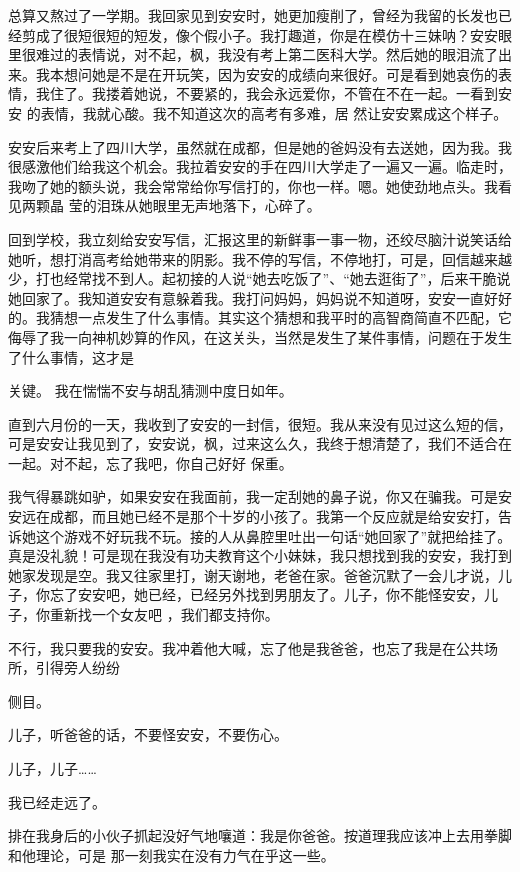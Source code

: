 \documentclass{article}
\begin{document}
总算又熬过了一学期。我回家见到安安时，她更加瘦削了，曾经为我留的长发也已经剪成了很短很短的短发，像个假小子。我打趣道，你是在模仿十三妹呐？安安眼里很难过的表情说，对不起，枫，我没有考上第二医科大学。然后她的眼泪流了出来。我本想问她是不是在开玩笑，因为安安的成绩向来很好。可是看到她哀伤的表情，我住了。我搂着她说，不要紧的，我会永远爱你，不管在不在一起。一看到安安
\newpage
的表情，我就心酸。我不知道这次的高考有多难，居
然让安安累成这个样子。 

安安后来考上了四川大学，虽然就在成都，但是她的爸妈没有去送她，因为我。我很感激他们给我这个机会。我拉着安安的手在四川大学走了一遍又一遍。临走时，我吻了她的额头说，我会常常给你写信打的，你也一样。嗯。她使劲地点头。我看见两颗晶
莹的泪珠从她眼里无声地落下，心碎了。 

回到学校，我立刻给安安写信，汇报这里的新鲜事一事一物，还绞尽脑汁说笑话给她听，想打消高考给她带来的阴影。我不停的写信，不停地打，可是，回信越来越少，打也经常找不到人。起初接的人说“她去吃饭了”、“她去逛街了”，后来干脆说她回家了。我知道安安有意躲着我。我打问妈妈，妈妈说不知道呀，安安一直好好的。我猜想一点发生了什么事情。其实这个猜想和我平时的高智商简直不匹配，它侮辱了我一向神机妙算的作风，在这关头，当然是发生了某件事情，问题在于发生了什么事情，这才是

\newpage
关键。 我在惴惴不安与胡乱猜测中度日如年。 

直到六月份的一天，我收到了安安的一封信，很短。我从来没有见过这么短的信，可是安安让我见到了，安安说，枫，过来这么久，我终于想清楚了，我们不适合在一起。对不起，忘了我吧，你自己好好
保重。 

我气得暴跳如驴，如果安安在我面前，我一定刮她的鼻子说，你又在骗我。可是安安远在成都，而且她已经不是那个十岁的小孩了。我第一个反应就是给安安打，告诉她这个游戏不好玩我不玩。接的人从鼻腔里吐出一句话“她回家了”就把给挂了。真是没礼貌！可是现在我没有功夫教育这个小妹妹，我只想找到我的安安，我打到她家发现是空。我又往家里打，谢天谢地，老爸在家。爸爸沉默了一会儿才说，儿子，你忘了安安吧，她已经，已经另外找到男朋友了。儿子，你不能怪安安，儿子，你重新找一个女友吧
，我们都支持你。 

不行，我只要我的安安。我冲着他大喊，忘了他是我爸爸，也忘了我是在公共场所，引得旁人纷纷
\newpage

侧目。 

儿子，听爸爸的话，不要怪安安，不要伤心。
 


儿子，儿子…… 


我已经走远了。 

排在我身后的小伙子抓起没好气地嚷道：我是你爸爸。按道理我应该冲上去用拳脚和他理论，可是
那一刻我实在没有力气在乎这一些。 
\end{document}
